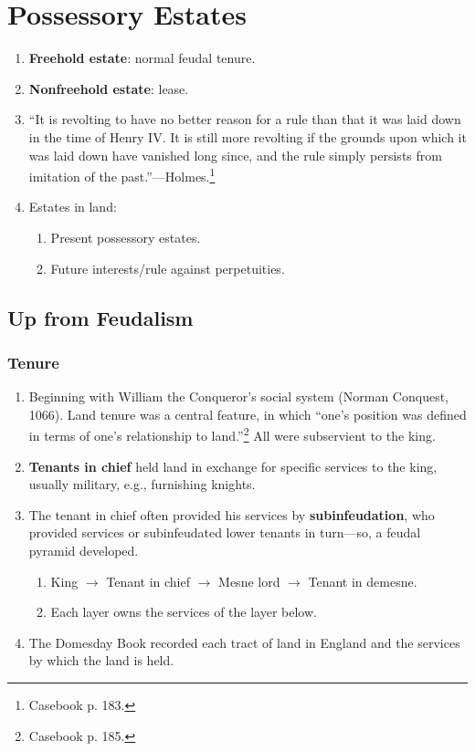 \section{Possessory Estates}

\begin{enumerate}
    \item \textbf{Freehold estate}: normal feudal tenure.
    \item \textbf{Nonfreehold estate}: lease.
    \item ``It is revolting to have no better reason for a rule than that it 
    was laid down in the time of Henry IV. It is still more revolting if the 
    grounds upon which it was laid down have vanished long since, and the rule 
    simply persists from imitation of the past.''---Holmes.\footnote{Casebook 
    p. 183.}
    \item Estates in land:
    \begin{enumerate}
        \item Present possessory estates.
        \item Future interests/rule against perpetuities.
    \end{enumerate}
\end{enumerate}

\subsection{Up from Feudalism}

\subsubsection{Tenure}

\begin{enumerate}
    \item Beginning with William the Conqueror's social system (Norman 
    Conquest, 1066). Land tenure was a central feature, in which ``one's 
    position was defined in terms of one's relationship to 
    land.''\footnote{Casebook p. 185.} All were subservient to the king.
    \item \textbf{Tenants in chief} held land in exchange for specific 
    services to the king, usually military, e.g., furnishing knights.
    \item The tenant in chief often provided his services by 
    \textbf{subinfeudation}, who provided services or subinfeudated lower 
    tenants in turn---so, a feudal pyramid developed.
    \begin{enumerate}
        \item King $\rightarrow$ Tenant in chief $\rightarrow$ Mesne lord 
        $\rightarrow$ Tenant in demesne.
        \item Each layer owns the services of the layer below.
    \end{enumerate}
    \item The Domesday Book recorded each tract of land in England and the 
    services by which the land is held.
\end{enumerate}

